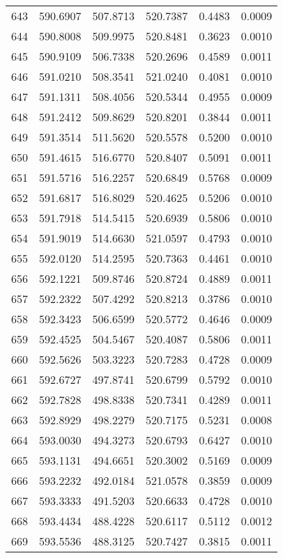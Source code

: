 \documentclass{article}
\begin{document}
\begin{longtable}{|c|c|c|c|c|c|}
643 & 590.6907 & 507.8713 & 520.7387 & 0.4483 & 0.0009 \\
644 & 590.8008 & 509.9975 & 520.8481 & 0.3623 & 0.0010 \\
645 & 590.9109 & 506.7338 & 520.2696 & 0.4589 & 0.0011 \\
646 & 591.0210 & 508.3541 & 521.0240 & 0.4081 & 0.0010 \\
647 & 591.1311 & 508.4056 & 520.5344 & 0.4955 & 0.0009 \\
648 & 591.2412 & 509.8629 & 520.8201 & 0.3844 & 0.0011 \\
649 & 591.3514 & 511.5620 & 520.5578 & 0.5200 & 0.0010 \\
650 & 591.4615 & 516.6770 & 520.8407 & 0.5091 & 0.0011 \\
651 & 591.5716 & 516.2257 & 520.6849 & 0.5768 & 0.0009 \\
652 & 591.6817 & 516.8029 & 520.4625 & 0.5206 & 0.0010 \\
653 & 591.7918 & 514.5415 & 520.6939 & 0.5806 & 0.0010 \\
654 & 591.9019 & 514.6630 & 521.0597 & 0.4793 & 0.0010 \\
655 & 592.0120 & 514.2595 & 520.7363 & 0.4461 & 0.0010 \\
656 & 592.1221 & 509.8746 & 520.8724 & 0.4889 & 0.0011 \\
657 & 592.2322 & 507.4292 & 520.8213 & 0.3786 & 0.0010 \\
658 & 592.3423 & 506.6599 & 520.5772 & 0.4646 & 0.0009 \\
659 & 592.4525 & 504.5467 & 520.4087 & 0.5806 & 0.0011 \\
660 & 592.5626 & 503.3223 & 520.7283 & 0.4728 & 0.0009 \\
661 & 592.6727 & 497.8741 & 520.6799 & 0.5792 & 0.0010 \\
662 & 592.7828 & 498.8338 & 520.7341 & 0.4289 & 0.0011 \\
663 & 592.8929 & 498.2279 & 520.7175 & 0.5231 & 0.0008 \\
664 & 593.0030 & 494.3273 & 520.6793 & 0.6427 & 0.0010 \\
665 & 593.1131 & 494.6651 & 520.3002 & 0.5169 & 0.0009 \\
666 & 593.2232 & 492.0184 & 521.0578 & 0.3859 & 0.0009 \\
667 & 593.3333 & 491.5203 & 520.6633 & 0.4728 & 0.0010 \\
668 & 593.4434 & 488.4228 & 520.6117 & 0.5112 & 0.0012 \\
669 & 593.5536 & 488.3125 & 520.7427 & 0.3815 & 0.0011 \\

\end{longtable}
\end{document}
